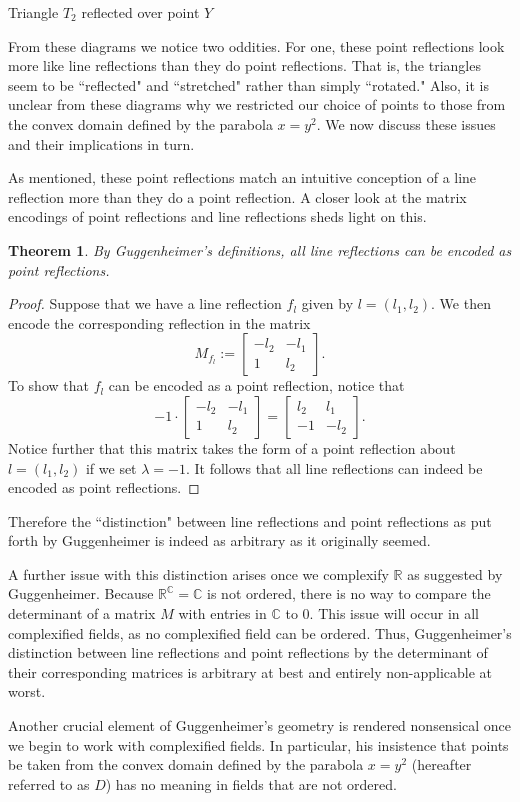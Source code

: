 \documentclass[12pt]{article}
\newcommand{\R}{\mathbb{R}}
\newcommand{\C}{\mathbb{C}}
\newcommand{\lftmat}[4]{\begin{bmatrix} {#1} & {#2} \\ {#3} & {#4} \end{bmatrix}}
\newcommand{\linenoendmat}[2]{\begin{bmatrix} -{#2} & -{#1} \\ 1 & {#2} \end{bmatrix}}
\newcommand{\stanlinenoendmat}{\linenoendmat{l_1}{l_2}}
\theoremstyle{plain}
\newtheorem{theorem}{Theorem}[section]
\theoremstyle{definition}
\begin{document}
\begin{center}
Triangle $T_2$ reflected over point $Y$ 
\end{center}
\fi


From these diagrams we notice two oddities. For one, these point reflections look more like line reflections than they do point reflections. That is, the triangles seem to be ``reflected" and ``stretched" rather than simply ``rotated." Also, it is unclear from these diagrams why we restricted our choice of points to those from the convex domain defined by the parabola $x = y^2$. We now discuss these issues and their implications in turn.

As mentioned, these point reflections match an intuitive conception of a line reflection more than they do a point reflection. A closer look at the matrix encodings of point reflections and line reflections sheds light on this. 

\begin{theorem}
By Guggenheimer's definitions, all line reflections can be encoded as point reflections. 
\end{theorem}

\begin{proof}
Suppose that we have a line reflection $f_l$ given by $l = (l_1, l_2)$. We then encode the corresponding reflection in the matrix 
\[ M_{f_l} := \stanlinenoendmat. \]
To show that $f_l$ can be encoded as a point reflection, notice that 
\[ -1 \cdot \stanlinenoendmat = \lftmat{l_2}{l_1}{-1}{-l_2}.\]
Notice further that this matrix takes the form of a point reflection about $l = (l_1, l_2)$ if we set $\lambda = -1$. It follows that all line reflections can indeed be encoded as point reflections.
\end{proof}

Therefore the ``distinction" between line reflections and point reflections as put forth by Guggenheimer is indeed as arbitrary as it originally seemed. 

A further issue with this distinction arises once we complexify $\R$ as suggested by Guggenheimer. Because $\R^{\C} = \C$ is not ordered, there is no way to compare the determinant of a matrix $M$ with entries in $\C$ to 0. This issue will occur in all complexified fields, as no complexified field can be ordered\cite{marsden_complex_book}. Thus, Guggenheimer's distinction between line reflections and point reflections by the determinant of their corresponding matrices is arbitrary at best and entirely non-applicable at worst.

Another crucial element of Guggenheimer's geometry is rendered nonsensical once we begin to work with complexified fields. In particular, his insistence that points be taken from the convex domain defined by the parabola $x = y^2$ (hereafter referred to as $D$) has no meaning in fields that are not ordered.
\end{document}
